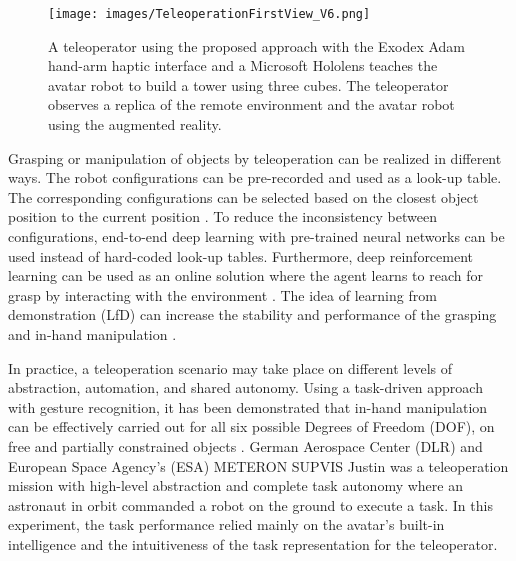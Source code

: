 \documentclass[letterpaper, 10 pt, conference]{ieeeconf}  %
\begin{document}
\begin{figure}[t]
    \centering
    \texttt{[image: images/TeleoperationFirstView\_V6.png]}
    \caption{A teleoperator using the proposed approach with the Exodex Adam hand-arm haptic interface and a Microsoft Hololens teaches the avatar robot to build a tower using three cubes. The teleoperator observes a replica of the remote environment and the avatar robot using the augmented reality.}
    \label{fig:first_image}
    \vspace{-6mm}
\end{figure}
\noindent


\noindent
Grasping or manipulation of objects by teleoperation can be realized in different ways. The robot configurations can be pre-recorded and used as a look-up table. The corresponding configurations can be selected based on the closest object position to the current position \cite{Hadi_ICRA}. To reduce the inconsistency between configurations, end-to-end deep learning with pre-trained neural networks \cite{Hadi_IROS} can be used instead of hard-coded look-up tables. Furthermore, deep reinforcement learning can be used as an online solution where the agent learns to reach for grasp by interacting with the environment \cite{Hadi_ICANN, Matthias_IJCNN, Matthias_grasp}. The idea of learning from demonstration (LfD) can increase the stability and performance of the grasping and in-hand manipulation \cite{freekpi2, mastersthesis1}.

\noindent
In practice, a teleoperation scenario may take place on different levels of abstraction, automation, and shared autonomy. Using a task-driven approach with gesture recognition, it has been demonstrated that in-hand manipulation can be effectively carried out for all six possible Degrees of Freedom (DOF), on free and partially constrained objects \cite{taskman}. German Aerospace Center (DLR) and European Space Agency's (ESA) METERON SUPVIS Justin \cite{justin2} was a teleoperation mission with high-level abstraction and complete task autonomy where an astronaut in orbit commanded a robot on the ground to execute a task. In this experiment, the task performance relied mainly on the avatar's built-in intelligence and the intuitiveness of the task representation for the teleoperator.
\end{document}
